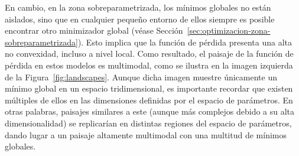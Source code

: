 En cambio, en la zona sobreparametrizada, los mínimos globales no están aislados, sino que en cualquier pequeño entorno de ellos siempre es posible encontrar otro minimizador global (véase Sección~\ref{sec:optimizacion-zona-sobreparametrizada}). Esto implica que la función de pérdida presenta una alta no convexidad, incluso a nivel local. Como resultado, el paisaje de la función de pérdida en estos modelos es multimodal, como se ilustra en la imagen izquierda de la Figura~\ref{fig:landscapes}. Aunque dicha imagen muestre únicamente un mínimo global en un espacio tridimensional, es importante recordar que existen múltiples de ellos en las dimensiones definidas por el espacio de parámetros. En otras palabras, paisajes similares a este (aunque más complejos debido a su alta dimensionalidad) se replicarían en distintas regiones del espacio de parámetros, dando lugar a un paisaje altamente multimodal con una multitud de mínimos globales. 

